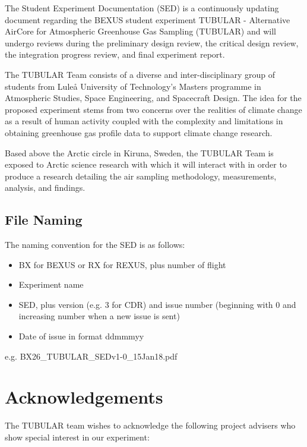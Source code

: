 \documentclass[a4paper,12pt,twoside]{article}
\begin{document}
The Student Experiment Documentation (SED) is a continuously updating document regarding the BEXUS student experiment TUBULAR - Alternative AirCore for Atmospheric Greenhouse Gas Sampling (TUBULAR) and will undergo reviews during the preliminary design review, the critical design review, the integration progress review, and final experiment report.

The TUBULAR Team consists of a diverse and inter-disciplinary group of students from Luleå University of Technology's Masters programme in Atmospheric Studies, Space Engineering, and Spacecraft Design. The idea for the proposed experiment stems from two concerns over the realities of climate change as a result of human activity coupled with the complexity and limitations in obtaining greenhouse gas profile data to support climate change research.

Based above the Arctic circle in Kiruna, Sweden, the TUBULAR Team is exposed to Arctic science research with which it will interact with in order to produce a research detailing the air sampling methodology, measurements, analysis, and findings.

\subsection*{File Naming}
The naming convention for the SED is as follows:
\begin{itemize}
  \item BX for BEXUS or RX for REXUS, plus number of flight
  \item Experiment name
  \item SED, plus version (e.g. 3 for CDR) and issue number (beginning with 0 and increasing number when a new issue is sent)
  \item Date of issue in format ddmmmyy
\end{itemize}
e.g. BX26\_TUBULAR\_SEDv1-0\_15Jan18.pdf


\newpage
\section*{Acknowledgements} \markboth{}{}

The TUBULAR team wishes to acknowledge the following project advisers who show special interest in our experiment:
\end{document}
